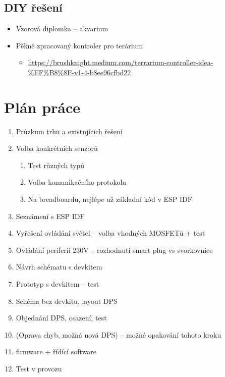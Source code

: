 \documentclass{customarticle}
\begin{document}
	\subsection*{DIY řešení}
	\begin{itemize}
		\item Vzorová diplomka -- akvarium
		\item Pěkně zpracovaný kontroler pro terárium
		\begin{itemize}
			\item \url{https://brushknight.medium.com/terrarium-controller-idea-%EF%B8%8F-v1-4-b8ee96cfbd22}
		\end{itemize}
	\end{itemize}


	\section*{Plán práce}
	\begin{enumerate}
		\item Průzkum trhu a existujících řešení
		\item Volba konkrétních senzorů
		\begin{enumerate}
			\item Test různých typů
			\item Volba komunikačního protokolu
			\item Na breadboardu, nejlépe už základní kód v ESP IDF
		\end{enumerate}
		\item Seznámení s ESP IDF
		\item Vyřešení ovládání světel  -- volba vhodných MOSFETů + test
		\item Ovládání periferií 230V -- rozhodnutí smart plug vs svorkovnice
		\item Návrh schématu s devkitem
		\item Prototyp s devkitem -- test
		\item Schéma bez devkitu, layout DPS
		\item Objednání DPS, osazení, test 
		\item (Oprava chyb, možná nová DPS) -- možné opakování tohoto kroku
		\item firmware + řídící software
		\item Test v provozu 
	\end{enumerate}
\end{document}
